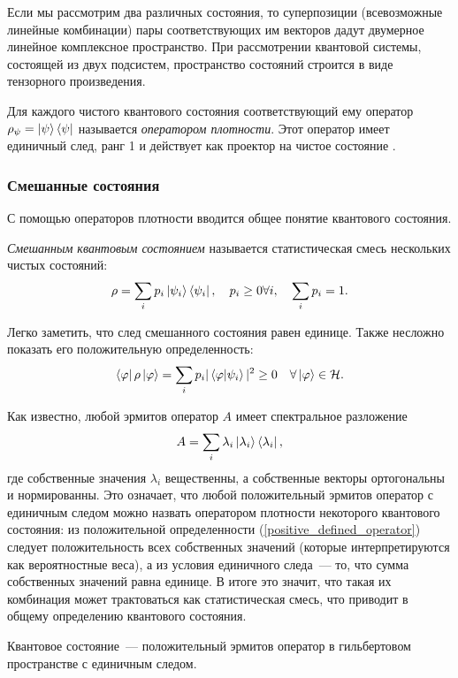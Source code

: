 Если мы рассмотрим два различных состояния, то суперпозиции (всевозможные линейные комбинации) пары соответствующих им векторов дадут двумерное линейное комплексное пространство.
При рассмотрении квантовой системы, состоящей из двух подсистем, пространство состояний строится в виде тензорного произведения. 

\begin{definition}
Для каждого чистого квантового состояния \state{\psi} соответствующий ему оператор
$\rho_\psi = \left| \psi \right\rangle \left\langle \psi \right|$ называется \textit{оператором плотности}.
Этот оператор имеет единичный след, ранг 1 и действует как проектор на чистое состояние \state{\psi}.  
\end{definition}


\subsubsection{Смешанные состояния}
С помощью операторов плотности вводится общее понятие квантового состояния.

\begin{definition}
  \textit{Смешанным квантовым состоянием} называется статистическая смесь нескольких чистых состояний:
\begin{equation}
  \rho = \sum_i p_i \left| \psi_i \right\rangle\left\langle \psi_i \right|, \quad p_i \ge 0 \forall i, \quad \sum_i p_i = 1.
\end{equation}
\end{definition}

Легко заметить, что след смешанного состояния равен единице. Также несложно показать его положительную определенность:
\begin{equation}\label{positive_defined_operator}
  \left\langle \varphi \right|\rho\left| \varphi \right\rangle = \sum_i p_i |\left\langle \varphi|\psi_i\right\rangle|^2 \ge 0 \quad \forall \left| \varphi \right\rangle \in \mathcal{H}.
\end{equation}

Как известно, любой эрмитов оператор $A$ имеет спектральное разложение
\begin{equation}
  A = \sum_i \lambda_i \left| \lambda_i \right\rangle\left\langle \lambda_i \right|,
\end{equation}
где собственные значения $\lambda_i$ вещественны, а собственные векторы  ортогональны и нормированны. Это означает, что любой положительный эрмитов оператор с единичным следом можно назвать оператором плотности некоторого квантового состояния: из положительной определенности (\ref{positive_defined_operator}) следует положительность всех собственных значений (которые интерпретируются как вероятностные веса), а из условия единичного следа~--- то, что сумма собственных значений равна единице. В итоге это значит, что такая их комбинация может трактоваться как статистическая смесь, что приводит в общему определению квантового состояния.
\begin{definition}
  Квантовое состояние~--- положительный эрмитов оператор в гильбертовом пространстве с единичным следом.
\end{definition}

